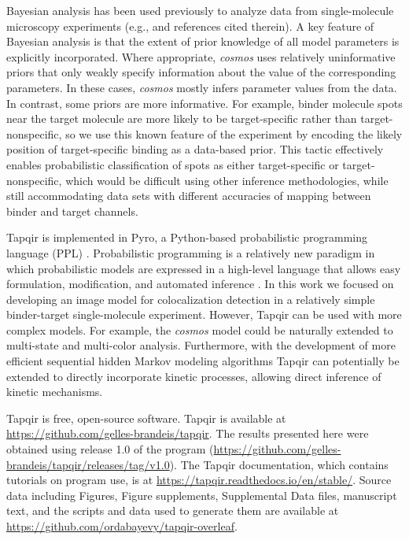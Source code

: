 Bayesian analysis has been used previously to analyze data from single-molecule microscopy experiments (e.g., \cite{Kinz-Thompson2021-tb} and references cited therein). A key feature of Bayesian analysis is that the extent of prior knowledge of all model parameters is explicitly incorporated. Where appropriate, \emph{cosmos} uses relatively uninformative priors that only weakly specify information about the value of the corresponding parameters.  In these cases, \emph{cosmos} mostly infers parameter values from the data.  In contrast, some priors are more informative.  For example, binder molecule spots near the target molecule are more likely to be target-specific rather than target-nonspecific, so we use this known feature of the experiment by encoding the likely position of target-specific binding as a data-based prior. This tactic effectively enables probabilistic classification of spots as either target-specific or target-nonspecific, which would be difficult using other inference methodologies, while still accommodating data sets with different accuracies of mapping between binder and target channels.

Tapqir is implemented in Pyro, a Python-based probabilistic programming language (PPL) \citep{Bingham2019-qy}. Probabilistic programming is a relatively new paradigm in which probabilistic models are expressed in a high-level language that allows easy formulation, modification, and automated inference \citep{Van_de_Meent2018-mi}. In this work we focused on developing an image model for colocalization detection in a relatively simple binder-target single-molecule experiment. However, Tapqir can be used with more complex models. For example, the \emph{cosmos} model could be naturally extended to multi-state and multi-color analysis. Furthermore, with the development of more efficient sequential hidden Markov modeling algorithms \citep{Sarkka2019-jw,Obermeyer2019-pp} Tapqir can potentially be extended to directly incorporate kinetic processes, allowing direct inference of kinetic mechanisms.

Tapqir is free, open-source software. Tapqir is available at \url{https://github.com/gelles-brandeis/tapqir}. The results presented here were obtained using release 1.0 of the program (\url{https://github.com/gelles-brandeis/tapqir/releases/tag/v1.0}). The Tapqir documentation, which contains tutorials on program use, is at \url{https://tapqir.readthedocs.io/en/stable/}. Source data including Figures, Figure supplements, Supplemental Data files, manuscript text, and the scripts and data used to generate them are available at \url{https://github.com/ordabayevy/tapqir-overleaf}.